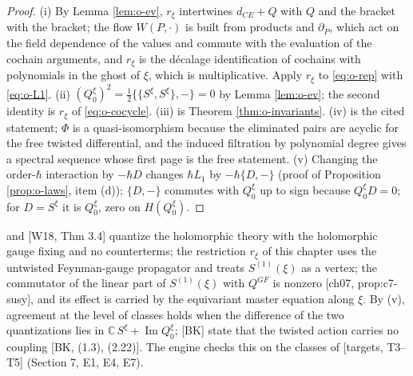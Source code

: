 \begin{proof}
(i) By Lemma \ref{lem:o-ev}, $r_\xi$ intertwines $d_{CE}+Q$ with $Q$ and the bracket with the bracket; the flow $W(P,\cdot)$ is built from products and $\partial_P$, which act on the field dependence of the values and commute with the evaluation of the cochain arguments, and $r_\xi$ is the décalage identification of cochains with polynomials in the ghost of $\xi$, which is multiplicative. Apply $r_\xi$ to \eqref{eq:o-rep} with \eqref{eq:o-L1}. (ii) $(Q_0^\xi)^2=\tfrac12\{\{S^\xi,S^\xi\},-\}=0$ by Lemma \ref{lem:o-ev}; the second identity is $r_\xi$ of \eqref{eq:o-cocycle}. (iii) is Theorem \ref{thm:o-invariants}. (iv) is the cited statement; $\Phi$ is a quasi-isomorphism because the eliminated pairs are acyclic for the free twisted differential, and the induced filtration by polynomial degree gives a spectral sequence whose first page is the free statement. (v) Changing the order-$\hbar$ interaction by $-\hbar D$ changes $\hbar L_1$ by $-\hbar\{D,-\}$ (proof of Proposition \ref{prop:o-laws}, item (d)); $\{D,-\}$ commutes with $Q_0^\xi$ up to sign because $Q_0^\xi D=0$; for $D=S^\xi$ it is $Q_0^\xi$, zero on $H(Q_0^\xi)$.
\end{proof}

\begin{remark} and [W18, Thm 3.4] quantize the holomorphic theory with the holomorphic gauge fixing and no counterterms; the restriction $r_\xi$ of this chapter uses the untwisted Feynman-gauge propagator and treats $S^{(1)}(\xi)$ as a vertex; the commutator of the linear part of $S^{(1)}(\xi)$ with $Q^{GF}$ is nonzero [ch07, prop:c7-susy], and its effect is carried by the equivariant master equation along $\xi$. By (v), agreement at the level of classes holds when the difference of the two quantizations lies in $\mathbb C\,S^\xi+\operatorname{Im}Q_0^\xi$; [BK] state that the twisted action carries no coupling [BK, (1.3), (2.22)]. The engine checks this on the classes of [targets, T3--T5] (Section 7, E1, E4, E7).
\end{remark}

